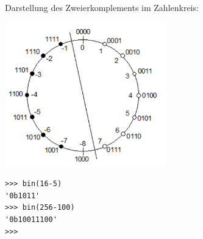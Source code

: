 \documentclass[10pt]{beamer}
\begin{document}
\begin{frame}[fragile]
Darstellung des Zweierkomplements im Zahlenkreis:

\begin{minipage}[c]{8cm}
\includegraphics[width=7cm]{bild4.png} 
\end{minipage} \pause
\begin{minipage}[b]{3cm}
\begin{lstlisting}[mathescape=true]
>>> bin(16-5)
'0b1011'
>>> bin(256-100)
'0b10011100'
>>> 

\end{lstlisting} 
\end{minipage} 
\end{frame}
%
%
%
%
\end{document}
